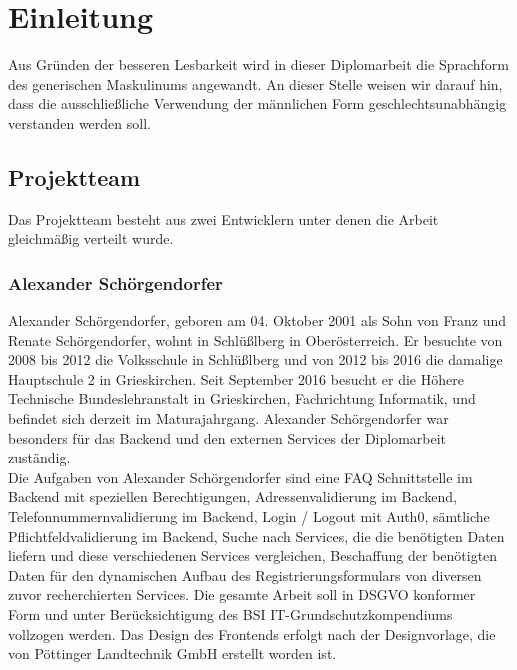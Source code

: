 \chapter{Einleitung} \label{sec:einleitung}
Aus Gründen der besseren Lesbarkeit wird in dieser Diplomarbeit die Sprachform des generischen Maskulinums angewandt. An dieser Stelle weisen wir darauf hin, dass die ausschließliche Verwendung der männlichen Form geschlechtsunabhängig verstanden werden soll.
\section{Projektteam}
Das Projektteam besteht aus zwei Entwicklern unter denen die Arbeit gleichmäßig verteilt wurde.
\subsection{Alexander Schörgendorfer}
Alexander Schörgendorfer, geboren am 04. Oktober 2001 als Sohn von Franz und Renate Schörgendorfer, wohnt in Schlüßlberg in Oberösterreich. Er besuchte von 2008 bis 2012 die Volksschule in Schlüßlberg und von 2012 bis 2016 die damalige Hauptschule 2 in Grieskirchen. Seit September 2016 besucht er die Höhere Technische Bundeslehranstalt in Grieskirchen, Fachrichtung Informatik, und befindet sich derzeit im Maturajahrgang. Alexander Schörgendorfer war besonders für das Backend und den externen Services der Diplomarbeit zuständig.\\
Die Aufgaben von Alexander Schörgendorfer sind eine FAQ Schnittstelle im Backend mit speziellen Berechtigungen, Adressenvalidierung im Backend, Telefonnummernvalidierung im Backend, Login / Logout mit Auth0, sämtliche Pflichtfeldvalidierung im Backend, Suche nach Services, die die benötigten Daten liefern und diese verschiedenen Services vergleichen, Beschaffung der benötigten Daten für den dynamischen Aufbau des Registrierungsformulars von diversen zuvor recherchierten Services. Die gesamte Arbeit soll in DSGVO konformer Form und unter Berücksichtigung des BSI IT-Grundschutzkompendiums vollzogen werden. Das Design des Frontends erfolgt nach der Designvorlage, die von Pöttinger Landtechnik GmbH erstellt worden ist.

